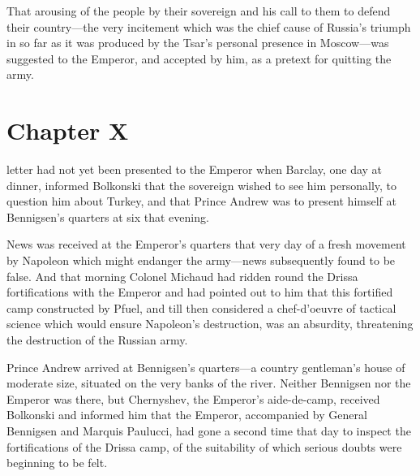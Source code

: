 That arousing of the people by their sovereign and his call to
them to defend their country---the very incitement which was the
chief cause of Russia's triumph in so far as it was produced by
the Tsar's personal presence in Moscow---was suggested to the
Emperor, and accepted by him, as a pretext for quitting the army.


\chapter*{Chapter X}
\ifaudio     
{} 
\fi

 letter had not yet been presented to the Emperor when
Barclay, one day at dinner, informed Bolkonski that the sovereign
wished to see him personally, to question him about Turkey, and
that Prince Andrew was to present himself at Bennigsen's quarters
at six that evening.

News was received at the Emperor's quarters that very day of a
fresh movement by Napoleon which might endanger the army---news
subsequently found to be false. And that morning Colonel Michaud
had ridden round the Drissa fortifications with the Emperor and
had pointed out to him that this fortified camp constructed by
Pfuel, and till then considered a chef-d'oeuvre of tactical
science which would ensure Napoleon's destruction, was an
absurdity, threatening the destruction of the Russian army.

Prince Andrew arrived at Bennigsen's quarters---a country
gentleman's house of moderate size, situated on the very banks of
the river. Neither Bennigsen nor the Emperor was there, but
Chernyshev, the Emperor's aide-de-camp, received Bolkonski and
informed him that the Emperor, accompanied by General Bennigsen
and Marquis Paulucci, had gone a second time that day to inspect
the fortifications of the Drissa camp, of the suitability of
which serious doubts were beginning to be felt.

